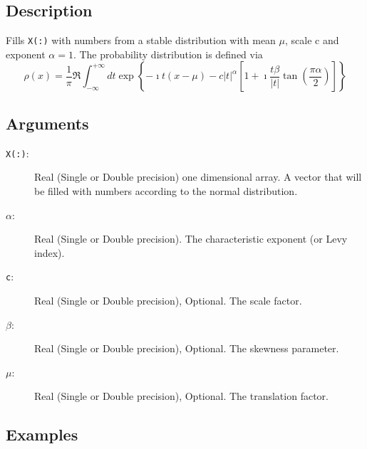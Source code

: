 \subsection{Description}

Fills \texttt{X(:)} with numbers from a stable distribution with
mean $\mu$, scale c and exponent $\alpha=1$. The probability
distribution is defined via
\begin{equation}
  \rho(x) = \frac{1}{\pi} \Re\int_{-\infty}^{+\infty} dt 
  \exp\left\{ -\imath t (x-\mu) - c|t|^\alpha\left[1+\imath\frac{t\beta}{|t|}\tan\left(\frac{\pi\alpha}{2}\right)\right] \right\}
\end{equation}

\subsection{Arguments}

\begin{description}
\item[\texttt{X(:)}:] Real (Single or Double precision) one
  dimensional array. A vector that will be filled with numbers
  according to the normal distribution.
\item[$\alpha$:] Real (Single or Double precision). The
  characteristic exponent (or Levy index).
\item[\texttt{c}:] Real (Single or Double precision), Optional. The
  scale factor.
\item[$\beta$:] Real (Single or Double precision), Optional. The 
  skewness parameter.
\item[$\mu$:] Real (Single or Double precision), Optional. The 
  translation factor.
\end{description}

\subsection{Examples}

